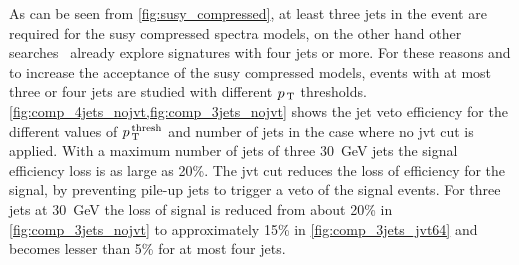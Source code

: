 As can be seen from \cref{fig:susy_compressed}, at least three jets in the event
are required for the \gls{susy} compressed spectra models, on the other hand
other searches~\cite{MultijetSUSY} already explore signatures with four jets or
more. For these reasons and to increase the acceptance of the \gls{susy}
compressed models, events with at most three or four jets are studied with
different $p_\mathrm{\, T}$ thresholds.  \cref{fig:comp_4jets_nojvt,fig:comp_3jets_nojvt}
shows the jet veto efficiency for the different values of
$p_\mathrm{\, T}^{\mathrm{\, thresh}}$ and number of jets in the case where no \gls{jvt} cut
is applied. With a maximum number of jets of three 30~GeV jets the signal
efficiency loss is as large as 20\%. The \gls{jvt} cut reduces the loss of
efficiency for the signal, by preventing pile-up jets to trigger a veto of the
signal events. For three jets at 30~GeV the loss of signal is reduced from about
20\% in \cref{fig:comp_3jets_nojvt} to approximately 15\% in
\cref{fig:comp_3jets_jvt64} and becomes lesser than 5\% for at most four jets.

